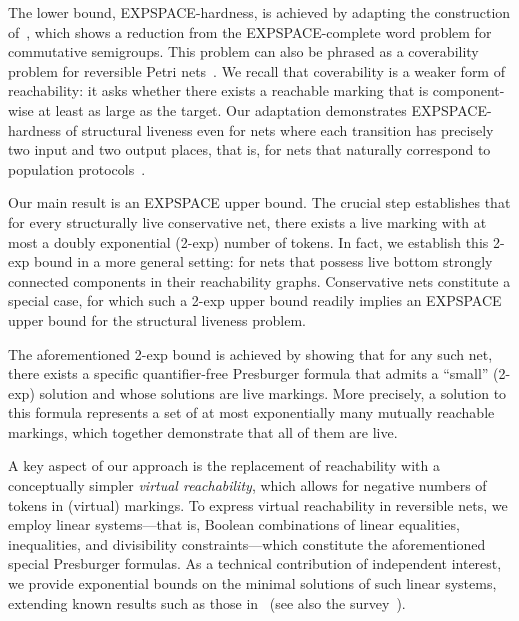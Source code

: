 The lower bound, EXPSPACE-hardness, is achieved by adapting the
construction of~\cite{DBLP:journals/acta/JancarP19}, which shows a
reduction from the EXPSPACE-complete word problem for commutative
semigroups. This problem can also be phrased as a coverability problem
for reversible Petri nets~\cite{DBLP:conf/stoc/CardozaLM76,
mayr1982complexity, DBLP:journals/jc/Mayr97}. We recall that
coverability is a weaker form of reachability: it asks whether there
exists a reachable marking that is component-wise at least as large as the target. Our adaptation demonstrates EXPSPACE-hardness of structural liveness even for nets where each transition has precisely two input and 
two output places, that is, for nets that naturally correspond to population protocols~\cite{DBLP:journals/dc/AngluinADFP06}.


Our main result is an EXPSPACE upper bound. The crucial step
establishes
that for every structurally live conservative net, there exists a live
marking with at most a doubly exponential (2-exp) number of tokens.
In fact, we establish this 2-exp bound in a more general setting: for nets
that possess live bottom strongly connected components in their
reachability graphs. Conservative nets constitute a
special case, for which such a 2-exp upper bound readily implies an
EXPSPACE upper bound for the structural liveness problem.

The aforementioned 2-exp bound is achieved by showing that for any
such net, there exists a specific quantifier-free
Presburger formula that admits a ``small'' (2-exp) solution and whose
solutions are live markings. More precisely, a solution to this
formula represents a set of at most exponentially many mutually
reachable markings, which together demonstrate that all of them are live.

A key aspect of our approach is the replacement of
reachability with a conceptually simpler \emph{virtual reachability},
which allows for negative numbers of tokens in (virtual) markings. To
express virtual reachability in reversible nets, we employ linear
systems---that  is, Boolean combinations of linear equalities,
inequalities, and
divisibility constraints---which constitute the aforementioned
special
Presburger formulas. As a technical contribution of independent
interest, we provide exponential bounds on the minimal solutions of
such linear systems, extending known results such as those
in~\cite{DBLP:conf/rta/Pottier91} (see also the survey~\cite{DBLP:journals/siglog/Haase18}).




